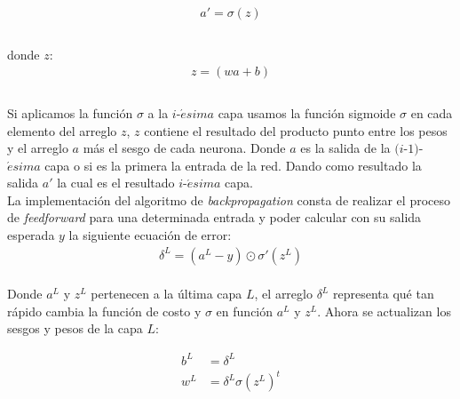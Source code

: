 \documentclass{iccmemoria}
\begin{document}
\begin{equation}
	\begin{split}
	a' = \sigma{(z)}\\
	\end{split}
\end{equation}\\

donde $z$:\\

\begin{equation}
	\begin{split}
	z = (wa + b)\\
	\end{split}
\end{equation}\\

Si aplicamos la función $\sigma$ a la $i$-$\acute{e}sima$ capa usamos la función sigmoide $\sigma$ en cada elemento del arreglo $z$, $z$ contiene el resultado del producto punto entre los pesos y el arreglo $a$ más el sesgo de cada neurona. Donde $a$ es la salida de la $(i$-$1)$-$\acute{e}sima$ capa o si es la primera la entrada de la red. Dando como resultado la salida $a'$ la cual es el resultado $i$-$\acute{e}sima$ capa.\\

La implementación del algoritmo de \emph{backpropagation} consta de realizar el proceso de \emph{feedforward} para una determinada entrada y poder calcular con su salida esperada $y$ la siguiente ecuación de error:\\

\begin{equation}
	\begin{split}
	\delta^L = (a^L-y) \odot \sigma'(z^L)
	\end{split}
\end{equation}\\

Donde $a^{L}$ y $z^{L}$ pertenecen a la última capa $L$, el arreglo $\delta^{L}$ representa qué tan rápido cambia la función de costo y $\sigma$ en función $a^{L}$ y $z^{L}$. Ahora se actualizan los sesgos y pesos de la capa $L$:

\begin{equation}
	\begin{split}
	b^L & = \delta^L\\
	w^L & = \delta^L \sigma(z^L)^t
	\end{split}
\end{equation}\\
\end{document}
